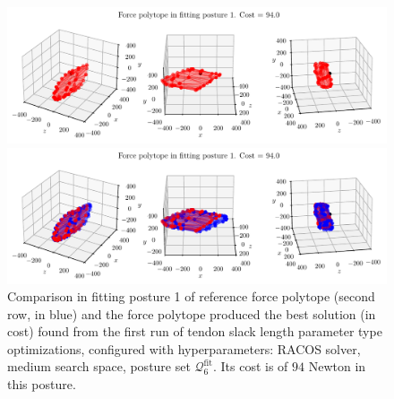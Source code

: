 \clearpage
\begin{figure}[!htb]
    \centering
    \captionsetup{justification=centering}
    
    \begin{minipage}{0.8\linewidth}
        \captionsetup{justification=centering}
        \centering
        \includegraphics[trim={0 0 0 0}, clip, width=1\linewidth]{img/chapter_4/reconstruction_stanford_imgs/polytope_racos_p6_tsl_medium_output_3207082_trial_1_fitting_posture_1.pdf}
    \end{minipage}
    \begin{minipage}{0.8\linewidth}
        \captionsetup{justification=centering}
        \centering
        \includegraphics[trim={0 0 0 20}, clip, width=1\linewidth]{img/chapter_4/reconstruction_stanford_imgs/polytope_racos_p6_tsl_medium_output_3207082_trial_1_fitting_posture_1_with_stanford.pdf}
    \end{minipage}
    \caption{Comparison in fitting posture 1 of reference force polytope (second row, in blue) and the force polytope produced the best solution (in cost) found from the first run of tendon slack length parameter type optimizations, configured with hyperparameters: RACOS solver, medium search space, posture set $\mathcal{Q}_6^{\text{fit}}$. Its cost is of $94$ Newton in this posture.}
    \label{fig:polytope_racos_p6_tsl_medium_output_3207082_trial_1_fitting_posture_1}
\end{figure}

